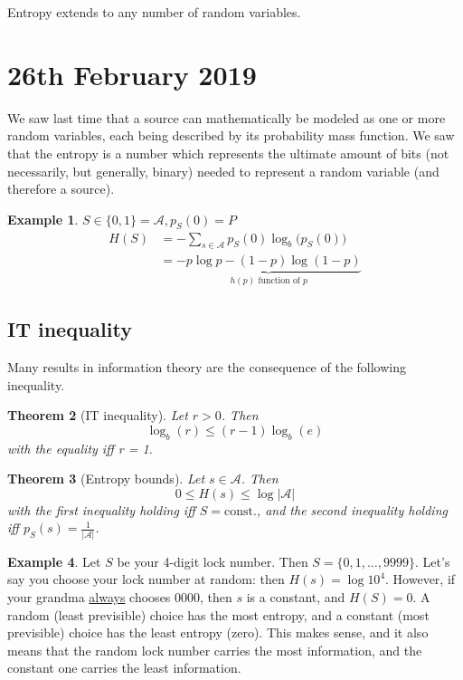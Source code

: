 \documentclass{report}
\theoremstyle{plain}
\newtheorem{thm}{Theorem}
\theoremstyle{definition}
\newtheorem{exmp}[thm]{Example}
\theoremstyle{remark}
\begin{document}
Entropy extends to any number of random variables.


\section{26th February 2019}
We saw last time that a source can mathematically be modeled as one or more random variables, each being described by its probability mass function. We saw that the entropy is a number which represents the ultimate amount of bits (not necessarily, but generally, binary) needed to represent a random variable (and therefore a source).
\begin{exmp}
$S \in \{0, 1\} = \mathcal A, p_S(0) = P$
\begin{align*}
	H(S) &= - \sum_{s \in \mathcal A} p_S(0) \log_b \bigl(p_S(0)\bigr) \\
	&= \underbrace{-p \log p - (1-p) \log(1-p)}_{h(p) \text{ function of $p$}}
\end{align*}
\end{exmp}

\subsection{IT inequality}
Many results in information theory are the consequence of the following inequality.
\begin{thm}[IT inequality]
Let $r > 0$. Then
\begin{equation}
	\log_b(r) \leq (r-1) \log_b (e) %
\end{equation}
with the equality iff r = 1.
\end{thm}

\begin{thm}[Entropy bounds]
Let $s \in \mathcal A$. Then
\begin{equation}
	0 \leq H(s) \leq \log|\mathcal A|
\end{equation}
with the first inequality holding iff $S=\text{const.}$, and the second inequality holding iff $p_S(s)=\frac{1}{|\mathcal A|}$.
\end{thm}

\begin{exmp}
	Let $S$ be your 4-digit lock number. Then $S = \{0, 1, \ldots, 9999\}$. Let's say you choose your lock number at random: then $H(s) = \log 10^4$. However, if your grandma \ul{always} chooses $0000$, then $s$ is a constant, and $H(S) = 0$. A random (least previsible) choice has the most entropy, and a constant (most previsible) choice has the least entropy (zero). This makes sense, and it also means that the random lock number carries the most information, and the constant one carries the least information.
\end{exmp}
\end{document}
